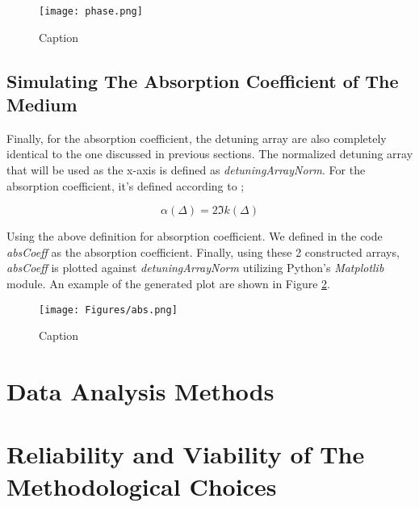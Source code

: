 \begin{figure}[h!]
    \centering
    \texttt{[image: phase.png]}
    \caption{Caption}
    \label{fig: phase}
\end{figure}

\subsection{Simulating The Absorption Coefficient of The Medium}
Finally, for the absorption coefficient, the detuning array are also completely identical to the one discussed in previous sections. The normalized detuning array that will be used as the x-axis is defined as \textit{detuningArrayNorm}. For the absorption coefficient, it's defined according to \cite{boyd2020nonlinear};

\begin{equation}
    \alpha(\Delta) = 2 \Im{k(\Delta)}
\end{equation}

Using the above definition for absorption coefficient. We defined in the code \textit{absCoeff} as the absorption coefficient. Finally, using these 2 constructed arrays, \textit{absCoeff} is plotted against \textit{detuningArrayNorm} utilizing Python's \textit{Matplotlib} module. An example of the generated plot are shown in Figure \ref{fig: abs}.

\begin{figure}[h!]
    \centering
    \texttt{[image: Figures/abs.png]}
    \caption{Caption}
    \label{fig: abs}
\end{figure}


\section{Data Analysis Methods}



\section{Reliability and Viability of The Methodological Choices}








